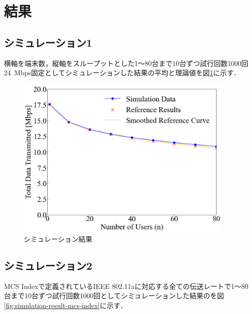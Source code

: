 \documentclass[a4paper,10pt]{ltjsarticle}
\begin{document}
\clearpage
\section{結果}

\subsection{シミュレーション1}
横軸を端末数，縦軸をスループットとした1～80台まで10台ずつ試行回数1000回24\, Mbps固定としてシミュレーションした結果の平均と理論値を図\ref{fig:simulation-result-a}に示す．





\begin{figure}[H]
  \centering
  \includegraphics[width=0.95\textwidth]{./assets/g3.png}
  \caption{シミュレーション結果}
  \label{fig:simulation-result-a}
\end{figure}


\clearpage
\subsection{シミュレーション2}

MCS Indexで定義されているIEEE 802.11aに対応する全ての伝送レートで1～80台まで10台ずつ試行回数1000回としてシミュレーションした結果のを図\ref{fig:simulation-result-mcs-index}に示す．
\end{document}
